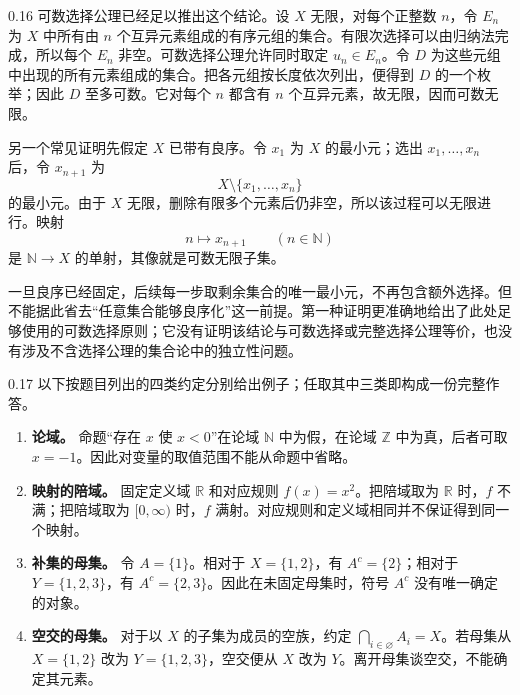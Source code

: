 \begin{solution}{0.16}
可数选择公理已经足以推出这个结论。设 \(X\) 无限，对每个正整数 \(n\)，令 \(E_n\) 为 \(X\) 中所有由 \(n\) 个互异元素组成的有序元组的集合。有限次选择可以由归纳法完成，所以每个 \(E_n\) 非空。可数选择公理允许同时取定 \(u_n\in E_n\)。令 \(D\) 为这些元组中出现的所有元素组成的集合。把各元组按长度依次列出，便得到 \(D\) 的一个枚举；因此 \(D\) 至多可数。它对每个 \(n\) 都含有 \(n\) 个互异元素，故无限，因而可数无限。

另一个常见证明先假定 \(X\) 已带有良序。令 \(x_1\) 为 \(X\) 的最小元；选出 \(x_1,\ldots,x_n\) 后，令 \(x_{n+1}\) 为
\[
  X\setminus\{x_1,\ldots,x_n\}
\]
的最小元。由于 \(X\) 无限，删除有限多个元素后仍非空，所以该过程可以无限进行。映射
\[
 n\longmapsto x_{n+1}\qquad(n\in\mathbb N)
\]
是 \(\mathbb N\to X\) 的单射，其像就是可数无限子集。

一旦良序已经固定，后续每一步取剩余集合的唯一最小元，不再包含额外选择。但不能据此省去“任意集合能够良序化”这一前提。第一种证明更准确地给出了此处足够使用的可数选择原则；它没有证明该结论与可数选择或完整选择公理等价，也没有涉及不含选择公理的集合论中的独立性问题。
\end{solution}

\begin{solution}{0.17}
以下按题目列出的四类约定分别给出例子；任取其中三类即构成一份完整作答。

\begin{enumerate}
  \item \textbf{论域。} 命题“存在 \(x\) 使 \(x<0\)”在论域 \(\mathbb N\) 中为假，在论域 \(\mathbb Z\) 中为真，后者可取 \(x=-1\)。因此对变量的取值范围不能从命题中省略。

  \item \textbf{映射的陪域。} 固定定义域 \(\mathbb R\) 和对应规则 \(f(x)=x^2\)。把陪域取为 \(\mathbb R\) 时，\(f\) 不满；把陪域取为 \([0,\infty)\) 时，\(f\) 满射。对应规则和定义域相同并不保证得到同一个映射。

  \item \textbf{补集的母集。} 令 \(A=\{1\}\)。相对于 \(X=\{1,2\}\)，有 \(A^c=\{2\}\)；相对于 \(Y=\{1,2,3\}\)，有 \(A^c=\{2,3\}\)。因此在未固定母集时，符号 \(A^c\) 没有唯一确定的对象。

  \item \textbf{空交的母集。} 对于以 \(X\) 的子集为成员的空族，约定 \(\bigcap_{i\in\varnothing}A_i=X\)。若母集从 \(X=\{1,2\}\) 改为 \(Y=\{1,2,3\}\)，空交便从 \(X\) 改为 \(Y\)。离开母集谈空交，不能确定其元素。
\end{enumerate}
\end{solution}

